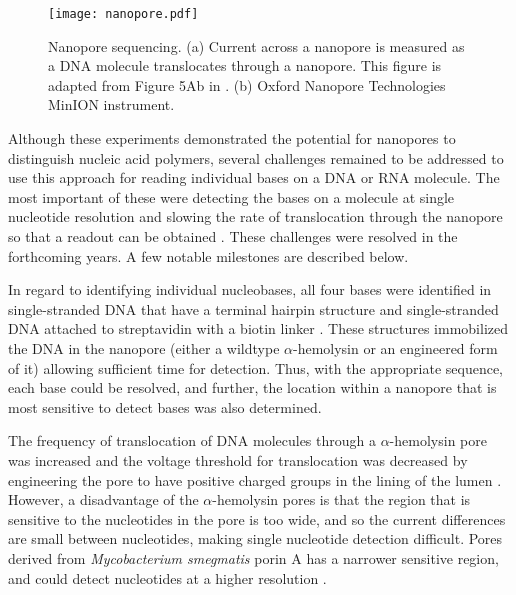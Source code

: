 \begin{figure}[b!]
\centering
\texttt{[image: nanopore.pdf]}
\caption[Nanopore sequencing]{
  Nanopore sequencing.
  (a) Current across a nanopore is
  measured as a DNA molecule translocates through a nanopore. This figure is
  adapted from Figure 5Ab in \cite{goodwin2016coming}.
  (b) Oxford Nanopore Technologies MinION instrument.}
\label{nanopore}
\end{figure}

Although these experiments demonstrated the potential for nanopores to
distinguish nucleic acid polymers, several challenges remained to be
addressed to use this approach for reading individual bases on a DNA or
RNA molecule.
%
The most important of these were detecting the bases on a molecule at
single nucleotide resolution and slowing the rate of translocation
through the nanopore so that a readout can be obtained
\citep{bayley2015nanopore,branton2010potential}.
%
These challenges were resolved in the forthcoming years. A few
notable milestones are described below.

In regard to identifying individual nucleobases, all four bases were
identified in single-stranded DNA that have a terminal hairpin structure
\citep{ashkenasy2005recognizing} and single-stranded DNA attached to
streptavidin with a biotin linker
\citep{purnell2009discrimination,stoddart2009single}. These structures
immobilized the DNA in the nanopore (either a wildtype
$\alpha$-hemolysin or an engineered form of it) allowing sufficient time
for detection. Thus, with the appropriate sequence, each base could be
resolved, and further, the location within a nanopore that is most
sensitive to detect bases was also determined.


The frequency of translocation of DNA molecules through a
$\alpha$-hemolysin pore was increased and the voltage threshold for
translocation was decreased by engineering the pore to have positive
charged groups in the lining of the lumen \citep{maglia2008enhanced}.
%
However, a disadvantage of the $\alpha$-hemolysin pores is that the
region that is sensitive to the nucleotides in the pore is too wide, and
so the current differences are small between nucleotides, making single
nucleotide detection difficult.
%
Pores derived from \emph{Mycobacterium smegmatis} porin A has a narrower
sensitive region, and could detect nucleotides at a higher resolution
\citep{butler2008single,manrao2011nucleotide}.

